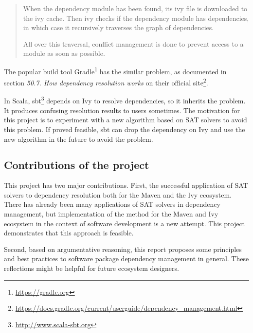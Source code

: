 \begin{quote}
  When the dependency module has been found, its ivy file is downloaded to the ivy cache. Then ivy checks if the dependency module has dependencies, in which case it recursively traverses the graph of dependencies.

  All over this traversal, conflict management is done to prevent access to a module as soon as possible.
\end{quote}

The popular build tool Gradle\footnote{\url{https://gradle.org}} has the similar problem, as documented in section \emph{50.7. How dependency resolution works} on their official site\footnote{\url{https://docs.gradle.org/current/userguide/dependency_management.html}}.

In Scala, sbt\footnote{\url{http://www.scala-sbt.org}} depends on Ivy to resolve dependencies, so it inherits the problem. It produces confusing resolution results to users sometimes. The motivation for this project is to experiment with a new algorithm based on SAT solvers to avoid this problem. If proved feasible, sbt can drop the dependency on Ivy and use the new algorithm in the future to avoid the problem.

\subsection{Contributions of the project}

This project has two major contributions. First, the successful application of SAT solvers to dependency resolution both for the Maven and the Ivy ecosystem. There has already been many applications of SAT solvers in dependency management\cite{mancinelli2006managing, berre2009dependency, vouillon2013software}, but implementation of the method for the Maven and Ivy ecosystem in the context of software development is a new attempt. This project demonstrates that this approach is feasible.

Second, based on argumentative reasoning, this report proposes some principles and best practices to software package dependency management in general. These reflections might be helpful for future ecosystem designers.






